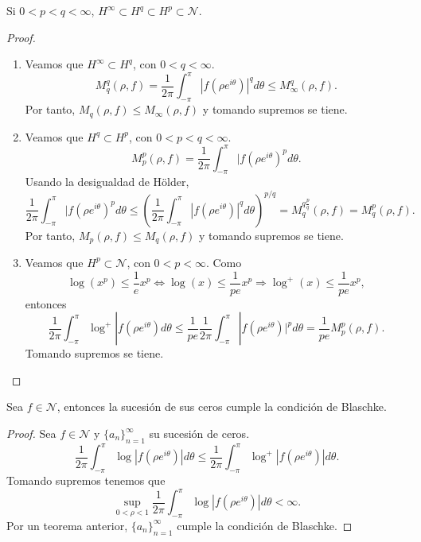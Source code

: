 \begin{theorem}
    Si $0 < p < q < \infty$, $H^\infty \subset H^q \subset H^p \subset \mathcal{N}$.
\end{theorem}

\begin{proof}
    \hfill
    \begin{enumerate}
        \item Veamos que $H^\infty \subset H^q$, con $0 < q < \infty$.
              $$M_q^q(\rho, f) = \frac{1}{2\pi} \int_{-\pi}^\pi |f(\rho e^{i\theta})|^q d\theta \leq M_\infty^q(\rho, f).$$
              Por tanto, $M_q(\rho, f) \leq M_\infty(\rho, f)$ y tomando supremos se tiene.

        \item Veamos que $H^q \subset H^p$, con $0 < p < q < \infty$.
              $$M_p^p(\rho, f) = \frac{1}{2\pi} \int_{-\pi}^\pi |f(\rho e^{i\theta})^p d\theta.$$
              Usando la desigualdad de Hölder,
              $$\frac{1}{2\pi} \int_{-\pi}^\pi |f(\rho e^{i\theta})^p d\theta \leq \left(\frac{1}{2\pi} \int_{-\pi}^\pi |f(\rho e^{i\theta})|^q d\theta\right)^{p/q} = M_q^{q\frac{p}{q}}(\rho, f) = M_q^p(\rho, f).$$
              Por tanto, $M_p(\rho, f) \leq M_q(\rho, f)$ y tomando supremos se tiene.

        \item Veamos que $H^p \subset \mathcal{N}$, con $0 < p < \infty$.
              Como
              $$\log(x^p) \leq \frac{1}{e}x^p \Leftrightarrow \log(x) \leq \frac{1}{pe}x^p \Rightarrow \log^+(x) \leq \frac{1}{pe}x^p,$$
              entonces
              $$\frac{1}{2\pi} \int_{-\pi}^\pi \log^+|f(\rho e^{i\theta})d\theta \leq \frac{1}{pe}\frac{1}{2\pi} \int_{-\pi}^\pi |f(\rho e^{i\theta})|^pd\theta = \frac{1}{pe}M_p^p(\rho, f).$$
              Tomando supremos se tiene.
    \end{enumerate}
\end{proof}

\begin{theorem}
    Sea $f \in \mathcal{N}$, entonces la sucesión de sus ceros cumple la condición de Blaschke.
\end{theorem}

\begin{proof}
    Sea $f \in \mathcal{N}$ y $\{a_n\}_{n=1}^\infty$ su sucesión de ceros.
    $$\frac{1}{2\pi} \int_{-\pi}^\pi \log|f(\rho e^{i\theta})|d\theta \leq \frac{1}{2\pi} \int_{-\pi}^\pi \log^+|f(\rho e^{i\theta})|d\theta.$$
    Tomando supremos tenemos que
    $$\sup_{0<\rho<1} \frac{1}{2\pi} \int_{-\pi}^\pi \log|f(\rho e^{i\theta})|d\theta < \infty.$$
    Por un teorema anterior, $\{a_n\}_{n=1}^\infty$ cumple la condición de Blaschke.
\end{proof}

